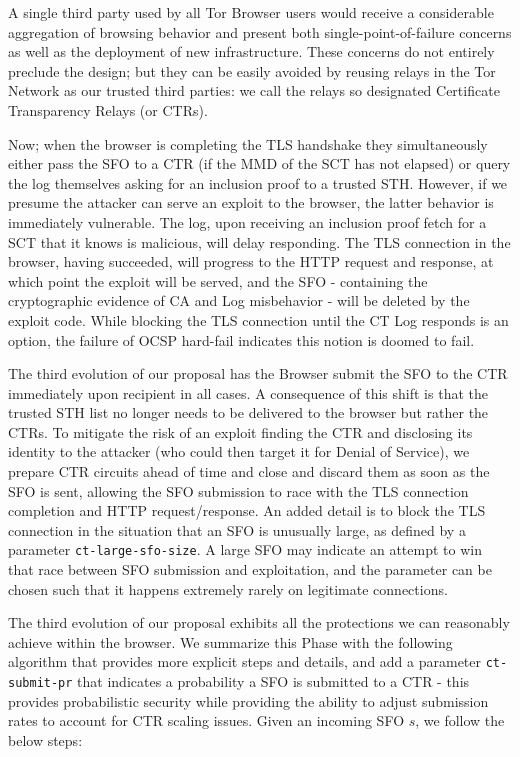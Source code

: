 A single third party used by all Tor Browser users would receive a considerable aggregation of browsing behavior and present both  single-point-of-failure concerns as well as the deployment of new infrastructure. These concerns do not entirely preclude the design; but they can be easily avoided by reusing relays in the Tor Network as our trusted third parties: we call the relays so designated Certificate Transparency Relays (or CTRs).

Now; when the browser is completing the TLS handshake they simultaneously either pass the SFO to a CTR (if the MMD of the SCT has not elapsed) or query the log themselves asking for an inclusion proof to a trusted STH.  However, if we presume the attacker can serve an exploit to the browser, the latter behavior is immediately vulnerable. The log, upon receiving an inclusion proof fetch for a SCT that it knows is malicious, will delay responding. The TLS connection in the browser, having succeeded, will progress to the HTTP request and response, at which point the exploit will be served, and the SFO - containing the cryptographic evidence of CA and Log misbehavior - will be deleted by the exploit code. While blocking the TLS connection until the CT Log responds is an option, the failure of OCSP hard-fail indicates this notion is doomed to fail. %

The third evolution of our proposal has the Browser submit the SFO to the CTR immediately upon recipient in all cases. A consequence of this shift is that the trusted STH list no longer needs to be delivered to the browser but rather the CTRs. To mitigate the risk of an exploit finding the CTR and disclosing its identity to the attacker (who could then target it for Denial of Service), we prepare CTR circuits ahead of time and close and discard them as soon as the SFO is sent, allowing the SFO submission to race with the TLS connection completion and HTTP request/response.  An added detail is to block the TLS connection in the situation that an SFO is unusually large, as defined by a parameter \texttt{ct-large-sfo-size}. A large SFO may indicate an attempt to win that race between SFO submission and exploitation, and the parameter can be chosen such that it happens extremely rarely on legitimate connections.

The third evolution of our proposal exhibits all the protections we can reasonably achieve within the browser. We summarize this Phase with the following algorithm that provides more explicit steps and details, and add a parameter \texttt{ct-submit-pr} that indicates a probability a SFO is submitted to a CTR - this provides probabilistic security while providing the ability to adjust submission rates to account for CTR scaling issues. Given an incoming SFO $s$, we follow the below steps: %

